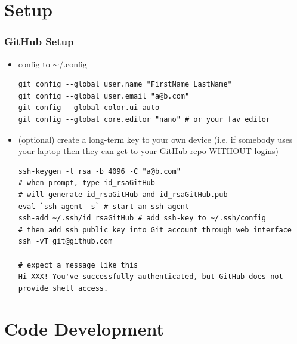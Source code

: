 \documentclass{beamer}
\begin{document}
\section{Setup}

\begin{frame}[fragile]
\frametitle{GitHub Setup}


\begin{itemize}

\item config to $\sim$/.config

\tiny
\begin{verbatim}
git config --global user.name "FirstName LastName"
git config --global user.email "a@b.com"
git config --global color.ui auto
git config --global core.editor "nano" # or your fav editor
\end{verbatim}
\normalsize

\item (optional) create a long-term key to your own device (i.e. if somebody uses your laptop then they can get to your GitHub repo WITHOUT logins)

\tiny
\begin{verbatim}
ssh-keygen -t rsa -b 4096 -C "a@b.com"
# when prompt, type id_rsaGitHub
# will generate id_rsaGitHub and id_rsaGitHub.pub
eval `ssh-agent -s` # start an ssh agent
ssh-add ~/.ssh/id_rsaGitHub # add ssh-key to ~/.ssh/config
# then add ssh public key into Git account through web interface
ssh -vT git@github.com

# expect a message like this
Hi XXX! You've successfully authenticated, but GitHub does not provide shell access.
\end{verbatim}
\normalsize

\end{itemize}

\end{frame}

\section{Code Development}
\end{document}
